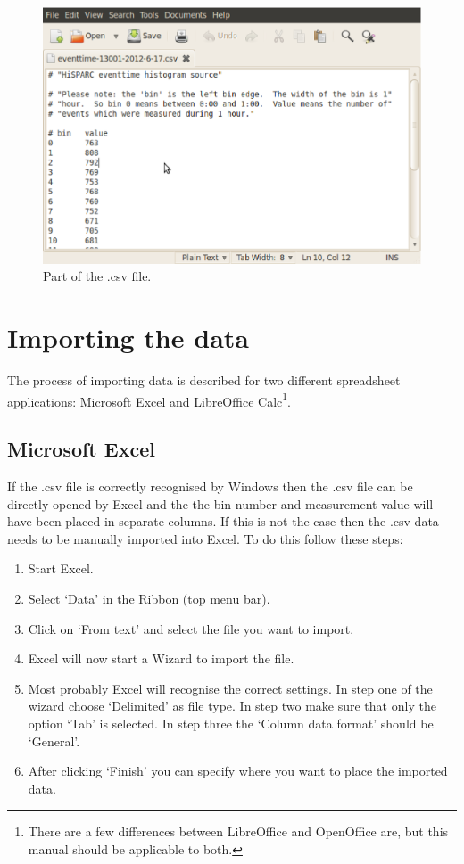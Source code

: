\documentclass[12pt,a4paper]{article}
\numberwithin{equation}{section}
\numberwithin{figure}{section}
\numberwithin{table}{section}
\begin{document}
\begin{figure}\begin{center}
\includegraphics[scale=0.5]{Screenshot_CSV_data_HiSPARC_Station_13001.eps}
\caption{Part of the .csv file.}\label{fig:data_CSV}
\end{center}\end{figure} 

\section{Importing the data}
The process of importing data is described for two different spreadsheet applications: Microsoft Excel and LibreOffice Calc\footnote{There are a few differences between LibreOffice and OpenOffice are, but this manual should be applicable to both.}.

\subsection{Microsoft Excel}
If the .csv file is correctly recognised by Windows then the .csv file can be directly opened by Excel and the the bin number and measurement value will have been placed in separate columns. If this is not the case then the .csv data needs to be manually imported into Excel. To do this follow these steps:
\begin{enumerate}[1.]
\item Start Excel.
\item Select `Data' in the Ribbon (top menu bar).
\item Click on `From text' and select the file you want to import.
\item Excel will now start a Wizard to import the file.
\item Most probably Excel will recognise the correct settings. In step one of the wizard choose `Delimited' as file type. In step two make sure that only the option `Tab' is selected. In step three the `Column data format' should be `General'.
\item After clicking `Finish' you can specify where you want to place the imported data.
\end{enumerate}
\end{document}
